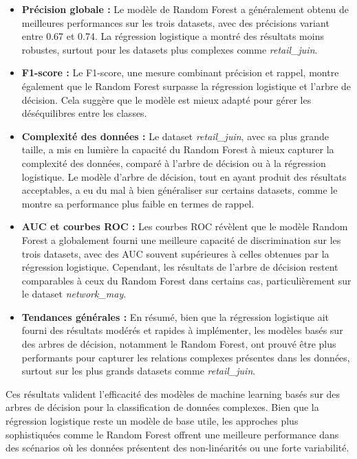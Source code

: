 \begin{itemize}
    \item \textbf{Précision globale :} Le modèle de Random Forest a généralement obtenu de meilleures performances sur les trois datasets, avec des précisions variant entre 0.67 et 0.74. La régression logistique a montré des résultats moins robustes, surtout pour les datasets plus complexes comme \textit{retail\_juin}.
    
    \item \textbf{F1-score :} Le F1-score, une mesure combinant précision et rappel, montre également que le Random Forest surpasse la régression logistique et l'arbre de décision. Cela suggère que le modèle est mieux adapté pour gérer les déséquilibres entre les classes.

    \item \textbf{Complexité des données :} Le dataset \textit{retail\_juin}, avec sa plus grande taille, a mis en lumière la capacité du Random Forest à mieux capturer la complexité des données, comparé à l'arbre de décision ou à la régression logistique. Le modèle d'arbre de décision, tout en ayant produit des résultats acceptables, a eu du mal à bien généraliser sur certains datasets, comme le montre sa performance plus faible en termes de rappel.

    \item \textbf{AUC et courbes ROC :} Les courbes ROC révèlent que le modèle Random Forest a globalement fourni une meilleure capacité de discrimination sur les trois datasets, avec des AUC souvent supérieures à celles obtenues par la régression logistique. Cependant, les résultats de l'arbre de décision restent comparables à ceux du Random Forest dans certains cas, particulièrement sur le dataset \textit{network\_may}.

    \item \textbf{Tendances générales :} En résumé, bien que la régression logistique ait fourni des résultats modérés et rapides à implémenter, les modèles basés sur des arbres de décision, notamment le Random Forest, ont prouvé être plus performants pour capturer les relations complexes présentes dans les données, surtout sur les plus grands datasets comme \textit{retail\_juin}.
\end{itemize}

Ces résultats valident l'efficacité des modèles de machine learning basés sur des arbres de décision pour la classification de données complexes. Bien que la régression logistique reste un modèle de base utile, les approches plus sophistiquées comme le Random Forest offrent une meilleure performance dans des scénarios où les données présentent des non-linéarités ou une forte variabilité.

